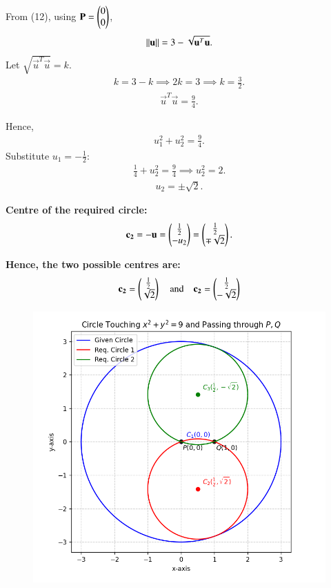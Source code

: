 \documentclass[journal]{IEEEtran}
\begin{document}
From (12), using $\mathbf{P} = \begin{pmatrix}0\\0\end{pmatrix}$,
\begin{align}
\left\lVert\mathbf{u}\right\rVert = 3 - \sqrt{\mathbf{u}^{T}\mathbf{u}}.
\end{align}
Let $\sqrt{\vec{u}^{T}\vec{u}} = k$.
\begin{align}
k = 3 - k \implies 2k = 3 \implies k = \frac{3}{2}.
\end{align}
\begin{align}
\vec{u}^{T}\vec{u} = \frac{9}{4}.
\end{align}

Hence,
\begin{align}
u_1^2 + u_2^2 = \frac{9}{4}.
\end{align}
Substitute $u_1 = -\frac{1}{2}$:
\begin{align}
\frac{1}{4} + u_2^2 = \frac{9}{4} \implies u_2^2 = 2.
\end{align}
\begin{align}
u_2 = \pm \sqrt{2}.
\end{align}


\textbf{Centre of the required circle:}
\begin{align}
\mathbf{c_2} = -\mathbf{u} = \begin{pmatrix}\frac{1}{2} \\ -u_2\end{pmatrix} = 
\begin{pmatrix}\frac{1}{2} \\ \mp \sqrt{2}\end{pmatrix}.
\end{align}

\textbf{Hence, the two possible centres are:}
\begin{align}
\mathbf{c_2} = \begin{pmatrix}\frac{1}{2} \\ \sqrt{2}\end{pmatrix} \quad \text{and} \quad
\mathbf{c_2} = \begin{pmatrix}\frac{1}{2} \\ -\sqrt{2}\end{pmatrix}
\end{align}

\begin{figure}[h!]
    \centering
    \includegraphics[height=0.5\textheight, keepaspectratio]{figs/fig.png}
    \label{figure_1}
\end{figure}
\end{document}
